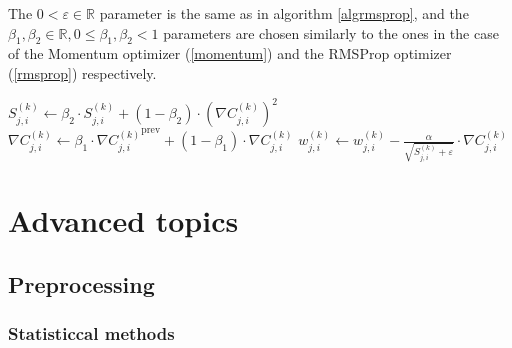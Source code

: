\documentclass[titlepage]{article}
\begin{document}
        The $0 < \varepsilon \in \mathbb{R}$ parameter is the same as in
        algorithm \ref{algrmsprop}, and the
        $\beta_1, \beta_2 \in \mathbb{R}, 0 \leq \beta_1, \beta_2 <1$ parameters
        are chosen similarly to the ones in the case of the Momentum optimizer
        (\ref{momentum}) and the RMSProp optimizer (\ref{rmsprop}) respectively.

        \begin{algorithm}
          \caption{%
            Modified version of algorithm \ref{algadjustweights} with Adam
            optimizer.
          } \label{algadam}
          \begin{algorithmic}
                    \State $
                      S_{j,i}^{(k)} \gets
                        \beta_2 \cdot S_{j,i}^{(k)}
                        + \left( 1 - \beta_2 \right)
                        \cdot \left( \nabla C_{j,i}^{(k)} \right)^2
                    $ 
                    \State $
                      \nabla C_{j,i}^{(k)} \gets
                        \beta_1 \cdot {\nabla C_{j,i}^{(k)}}^\text{prev}
                        +
                        \left( 1 - \beta_1 \right) \cdot \nabla C_{j,i}^{(k)}
                    $ 
                    \State $
                      w_{j,i}^{(k)} \gets
                        w_{j,i}^{(k)}
                        - \frac{\alpha}{\sqrt{S_{j,i}^{(k)} + \varepsilon}}
                        \cdot \nabla C_{j,i}^{(k)}
                    $
                  \EndFor
                \EndFor
              \EndFor
            \EndProcedure
          \end{algorithmic}
        \end{algorithm}

\newpage

  \section{Advanced topics}

    \subsection{Preprocessing}

      \subsubsection{Statisticcal methods}
\end{document}
